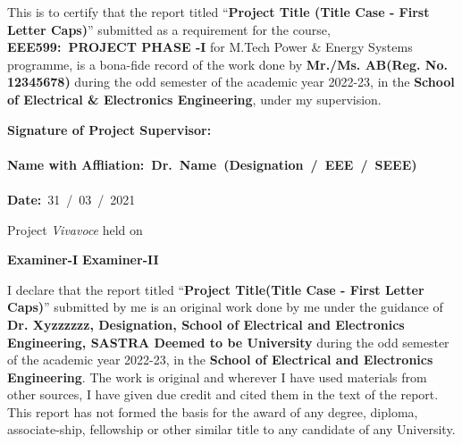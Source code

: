 \documentclass[a4paper, 12pt, oneside]{sastra1}
\begin{document}
	\begin{doublespace}
		\linespread{2}
		
		This is to certify that the report titled ``\textbf{Project Title (Title Case - First Letter Caps)}'' submitted as a requirement for the course, {\textbf{EEE599:~PROJECT PHASE -I}} for M.Tech Power \& Energy Systems programme, is a bona-fide record of the work done by \textbf{Mr./Ms. AB(Reg. No. 12345678)} during the odd semester of the academic year 2022-23, in the \textbf{School of Electrical \& Electronics Engineering}, under my supervision.
		
	\end{doublespace}
	\vspace*{0.4in}
	
	\noindent\textbf{Signature of Project Supervisor:}~	\\ %
	\\
	\textbf{Name with Affliation\hspace*{19mm}:~\textbf{Dr.~Name}~(Designation~/~EEE~/~SEEE)}	\\
	\\
	\textbf{Date\hspace*{48.25mm}:}~31~/~03~/~2021\\%
	
	\vspace*{0.35in}
	
	\noindent Project \textit{Vivavoce} held on
	
	\vspace*{0.50in}
	\noindent \textbf{Examiner-I} \hspace*{120mm} \textbf{Examiner-II}
	
	
	\declaration
	
	
	\begin{doublespace}
		\linespread{2}
		
		I declare that the report titled ``\textbf{Project Title(Title Case - First Letter Caps)}'' submitted by me is an original work done by me under the guidance of \textbf{Dr. Xyzzzzzz, Designation, School of Electrical and Electronics Engineering, SASTRA Deemed to be University} during the odd semester of the academic year 2022-23, in the \textbf{School of Electrical and Electronics Engineering}. The work is original and wherever I have used materials from other sources, I have given due credit and cited them in the text of the report. This report has not formed the basis for the award of any degree, diploma, associate-ship, fellowship or other similar title to any candidate of any University.\\
		
	\end{doublespace}
	
\end{document}
